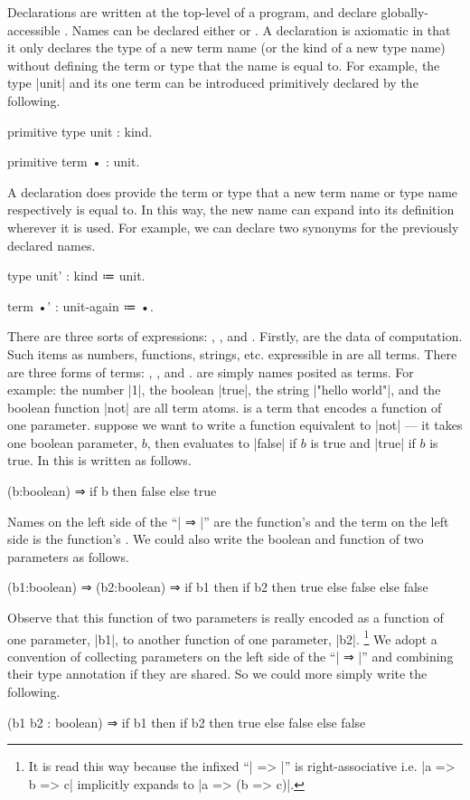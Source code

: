\newparagraph
Declarations are written at the top-level of a program, and declare globally-accessible .
Names can be declared either  or .
A  declaration is axiomatic in that it only declares the type of a new term name (or the kind of a new type name) without defining the term or type that the name is equal to.
For example, the type \code|unit| and its one term can be introduced primitively declared by the following.
%
\begin{snippet}
primitive type unit : kind.

primitive term • : unit.
\end{snippet}
%
A  declaration does provide the term or type that a new term name or type name respectively is equal to.
In this way, the new name can expand into its definition wherever it is used.
For example, we can declare two synonyms for the previously declared names.
%
\begin{snippet}
type unit' : kind ≔ unit.

term •' : unit-again ≔ •.
\end{snippet}

There are three sorts of expressions: , , and .
Firstly,  are the data of computation.
Such items as numbers, functions, strings, etc. expressible in \LangA are all terms.
There are three forms of terms: , , and .
 are simply names posited as terms.
For example: the number \code|1|, the boolean \code|true|, the string \code|"hello world"|, and the boolean function \code|not| are all term atoms.
 is a term that encodes a function of one parameter.
suppose we want to write a function equivalent to \code|not| ---
it takes one boolean parameter, $b$, then evaluates to \code|false| if $b$ is true and \code|true| if $b$ is true.
In \LangA this is written as follows.
%
\begin{snippet}
(b:boolean) ⇒ if b then false else true
\end{snippet}
%
Names on the left side of the ``\code| ⇒ |'' are the function's  and the term on the left side is the function's .
We could also write the boolean and function of two parameters as follows.
%
\begin{snippet}
(b1:boolean) ⇒
  (b2:boolean) ⇒
    if b1
      then if b2 then true else false
      else false
\end{snippet}
%
Observe that this function of two parameters is really encoded as a function of one parameter, \code|b1|, to another function of one parameter, \code|b2|.%
\footnote{
  It is read this way because the infixed ``\code| => |'' is right-associative i.e. \code|a => b => c| implicitly expands to \code|a => (b => c)|.
}
We adopt a convention of collecting parameters on the left side of the ``\code| ⇒ |'' and combining their type annotation if they are shared.
So we could more simply write the following.
%
\begin{snippet}
(b1 b2 : boolean) ⇒
  if b1
    then if b2 then true else false
    else false
\end{snippet}
%


